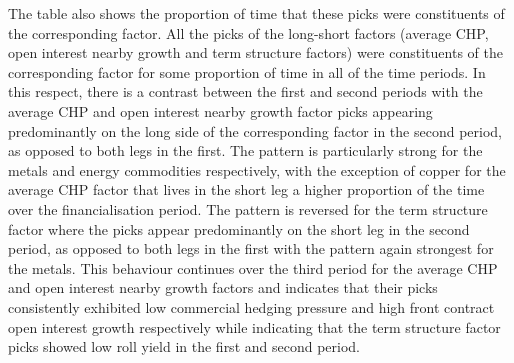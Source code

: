 \documentclass[]{elsarticle} %
\begin{document}
The table also shows the proportion of time that these picks were constituents of the corresponding factor. All the picks of the long-short factors (average CHP, open interest nearby growth and term structure factors) were constituents of the corresponding factor for some proportion of time in all of the time periods. In this respect, there is a contrast between the first and second periods with the average CHP and open interest nearby growth factor picks appearing predominantly on the long side of the corresponding factor in the second period, as opposed to both legs in the first. The pattern is particularly strong for the metals and energy commodities respectively, with the exception of copper for the average CHP factor that lives in the short leg a higher proportion of the time over the financialisation period. The pattern is reversed for the term structure factor where the picks appear predominantly on the short leg in the second period, as opposed to both legs in the first with the pattern again strongest for the metals. This behaviour continues over the third period for the average CHP and open interest nearby growth factors and indicates that their picks consistently exhibited low commercial hedging pressure and high front contract open interest growth respectively while indicating that the term structure factor picks showed low roll yield in the first and second period.

\medskip\setlength{\parindent}{0pt}
\end{document}
